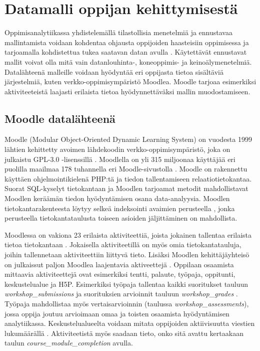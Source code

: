 \color{black}
\chapter{Datamalli oppijan kehittymisestä\label{datamallioppijankehittymisesta}}

Oppimisanalytiikassa yhdistelemällä tilastollisia menetelmiä ja ennustavaa mallintamista voidaan kohdentaa ohjausta oppijoiden haasteisiin oppimisessa ja tarjoamalla kohdistettua tukea saatavan datan avulla \citep{ranjeethSurveyPredictiveModels2020}. Käytettävät ennustavat mallit voivat olla mitä vain datanlouhinta-, koneoppimis- ja keinoälymenetelmiä. Datalähteenä malleille voidaan hyödyntää eri oppijasta tietoa sisältäviä järjestelmiä, kuten verkko-oppimisympäristö Moodlea. Moodle tarjoaa esimerkiksi aktiviteeteistä laajasti erilaista tietoa hyödynnettäväksi mallin muodostamiseen.

\section{Moodle datalähteenä}

Moodle (Modular Object-Oriented Dynamic Learning System) on vuodesta 1999 lähtien kehittetty avoimen lähdekoodin verkko-oppimisympäristö, joka on julkaistu GPL-3.0 -lisenssillä \citep{dougiamasPowerOpenEducational2021,dougiamasMoodle2022}. Moodlella on yli 315 miljoonaa käyttäjää eri puolilla maailmaa 178 tuhannella eri Moodle-sivustolla \citep{moodle.orgMoodleStatistics}. Moodle on rakennettu käyttäen ohjelmointikielenä PHP:tä ja tiedon tallentamiseen relaatiotietokantaa. Suorat SQL-kyselyt tietokantaan ja Moodlen tarjoamat metodit mahdollistavat Moodlen keräämän tiedon hyödyntämisen osana data-analyysia. Moodlen tietokantarakenteesta löytyy selkeä indeksointi avaimien perusteella \citep{greenMoodle11Database2022}, jonka perusteella tietokantataulusta toiseen asioiden jäljittäminen on mahdollista.

Moodlessa on vakiona 23 erilaista aktiviteettiä, joista jokainen tallentaa erilaista tietoa tietokantaan \citep{dougiamasMoodle2022}. Jokaisella aktiviteetillä on myös omia tietokantatauluja, joihin tallennetaan aktiviteettiin liittyvä tieto. Lisäksi Moodlen kehittäjäyhteisö on julkaissut paljon Moodlea laajentavia aktiveettejä \citep{moodle.orgMoodlePluginsDirectory2022}. Oppilaan osaamista mittaavia aktiviteettejä ovat esimerkiksi tentti, palaute, työpaja, oppitunti, keskustelualue ja H5P. Esimerkiksi työpaja tallentaa kaikki suoritukset tauluun \emph{workshop\_submissions} ja suorituksien arvioinnit tauluun \emph{workshop\_grades} \citep{greenMoodle11Database2022}. Työpaja mahdollistaa myös vertaisarvioinnin (taulussa \emph{workshop\_assessments}), jossa oppija joutuu arvioimaan omaa ja toisten osaamista hyödyntämisen analytiikassa. Keskustelualueelta voidaan mitata oppijoiden aktiivisuutta viestien lukumäärällä \citep{mwalumbweUsingLearningAnalytics2017}. Aktiviteetistä myös saadaan tieto, onko sitä avattu kertaakaan taulun \emph{course\_module\_completion} avulla.

